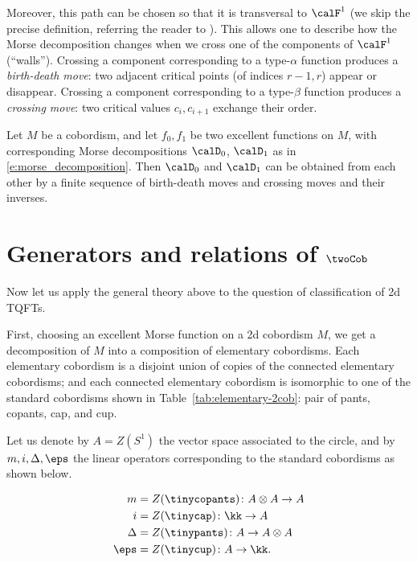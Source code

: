 Moreover, this path can be chosen so that it is transversal to $\calF^1$ (we
skip the precise definition, referring the reader to ).
This allows one to describe how the Morse decomposition changes when we cross
one of the components of $\calF^1$ (``walls''). Crossing a component
corresponding to a type-$\alpha$ function produces a \emph{birth-death move}:
two adjacent critical points (of indices $r-1, r$) appear or disappear.
Crossing a component corresponding to a type-$\beta$ function produces a
\emph{crossing move}: two critical values $c_i, c_{i+1}$ exchange their order.

\begin{theorem}\label{t:cerf}
  Let $M$ be a cobordism, and let $f_0, f_1$ be two excellent functions on
  $M$, with corresponding Morse decompositions $\calD_0$, $\calD_1$ as in
  \eqref{e:morse_decomposition}. Then $\calD_0$ and $\calD_1$ can be obtained
  from each other by a finite sequence of birth-death moves and crossing
  moves and their inverses.
\end{theorem}


\section{Generators and relations of $\twoCob$}\label{s:2cob-relations}

Now let us apply the general theory above to the question of classification
of 2d TQFTs.

First, choosing an excellent Morse function on a 2d cobordism $M$, we get a
decomposition of $M$ into a composition of elementary cobordisms. Each elementary
cobordism is a disjoint union of copies of the connected elementary cobordisms;
and each connected elementary cobordism is isomorphic to one of the standard
cobordisms shown in Table~\ref{tab:elementary-2cob}: pair of pants, copants,
cap, and cup.

Let us denote by $A=Z(S^1)$ the vector space associated to the circle, and by
$m, i, \Delta, \eps$ the linear operators corresponding to the standard
cobordisms as shown below.

\begin{equation}\label{e:frobenius-data}
  \begin{aligned}
    m&=Z(\tinycopants)\colon A\otimes A\to A\\
    i&=Z(\tinycap)\colon \kk \to A\\
    \Delta&=Z(\tinypants)\colon A\to A\otimes A\\
    \eps&=Z(\tinycup)\colon A\to \kk.
  \end{aligned}
\end{equation}


